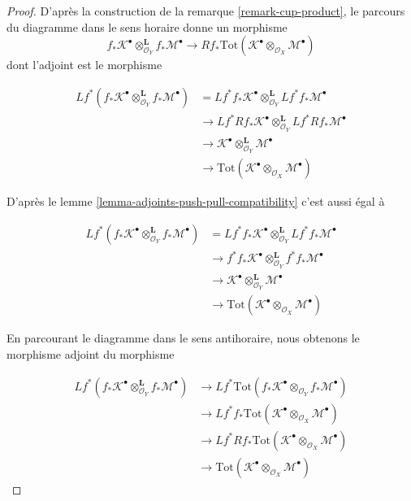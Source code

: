 \begin{proof}

D'après la construction de la remarque \ref{remark-cup-product}, le parcours du diagramme dans le sens horaire donne un morphisme
$$
f_*\mathcal{K}^\bullet
\otimes_{\mathcal{O}_Y}^\mathbf{L}
f_*\mathcal{M}^\bullet 
\longrightarrow
Rf_*\text{Tot}(\mathcal{K}^\bullet
\otimes_{\mathcal{O}_X}
\mathcal{M}^\bullet)
$$
dont l'adjoint est le morphisme

\begin{align*}
Lf^*(f_*\mathcal{K}^\bullet
\otimes_{\mathcal{O}_Y}^\mathbf{L}
f_*\mathcal{M}^\bullet)
& =
Lf^*f_*\mathcal{K}^\bullet
\otimes_{\mathcal{O}_Y}^\mathbf{L}
Lf^*f_*\mathcal{M}^\bullet \\
& \to
Lf^*Rf_*\mathcal{K}^\bullet
\otimes_{\mathcal{O}_Y}^\mathbf{L}
Lf^*Rf_*\mathcal{M}^\bullet \\
& \to
\mathcal{K}^\bullet
\otimes_{\mathcal{O}_Y}^\mathbf{L}
\mathcal{M}^\bullet \\
& \to
\text{Tot}(\mathcal{K}^\bullet
\otimes_{\mathcal{O}_X}
\mathcal{M}^\bullet)
\end{align*}

D'après le lemme \ref{lemma-adjoints-push-pull-compatibility} c'est aussi égal à

\begin{align*}
Lf^*(f_*\mathcal{K}^\bullet
\otimes_{\mathcal{O}_Y}^\mathbf{L}
f_*\mathcal{M}^\bullet)
& =
Lf^*f_*\mathcal{K}^\bullet
\otimes_{\mathcal{O}_Y}^\mathbf{L}
Lf^*f_*\mathcal{M}^\bullet \\
& \to
f^*f_*\mathcal{K}^\bullet
\otimes_{\mathcal{O}_Y}^\mathbf{L}
f^*f_*\mathcal{M}^\bullet \\
& \to
\mathcal{K}^\bullet
\otimes_{\mathcal{O}_Y}^\mathbf{L}
\mathcal{M}^\bullet \\
& \to
\text{Tot}(\mathcal{K}^\bullet
\otimes_{\mathcal{O}_X}
\mathcal{M}^\bullet)
\end{align*}

En parcourant le diagramme dans le sens antihoraire, nous obtenons le morphisme adjoint du morphisme

\begin{align*}
Lf^*(f_*\mathcal{K}^\bullet
\otimes_{\mathcal{O}_Y}^\mathbf{L}
f_*\mathcal{M}^\bullet)
& \to
Lf^*\text{Tot}(
f_*\mathcal{K}^\bullet
\otimes_{\mathcal{O}_Y}
f_*\mathcal{M}^\bullet) \\
& \to
Lf^*f_*\text{Tot}(\mathcal{K}^\bullet
\otimes_{\mathcal{O}_X}
\mathcal{M}^\bullet) \\
& \to
Lf^*Rf_*\text{Tot}(\mathcal{K}^\bullet
\otimes_{\mathcal{O}_X}
\mathcal{M}^\bullet) \\
& \to
\text{Tot}(\mathcal{K}^\bullet
\otimes_{\mathcal{O}_X}
\mathcal{M}^\bullet)
\end{align*}


\end{proof}
